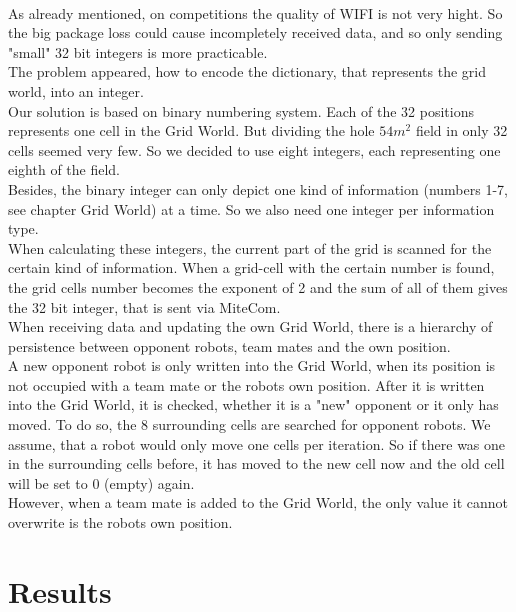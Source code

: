 \documentclass[lnicst,a4paper]{svmultln}
\begin{document}
\\
As already mentioned, on competitions the quality of WIFI is not very hight. So the big package loss could cause incompletely received data, and so only sending "small" 32 bit integers is more practicable. 
\\
The problem appeared, how to encode the dictionary, that represents the grid world, into an integer.
\\
Our solution is based on binary numbering system. Each of the 32 positions represents one cell in the Grid World. But dividing the hole $54m^2$ field in only 32 cells seemed very few. So we decided to use eight integers, each representing one eighth of the field.
\\
Besides, the binary integer can only depict one kind of information (numbers 1-7, see chapter Grid World) at a time. So we also need one integer per information type.
\\
When calculating these integers, the current part of the grid is scanned for the certain kind of information. When a grid-cell with the certain number is found, the grid cells number becomes the exponent of 2 and the sum of all of them gives the 32 bit integer, that is sent via MiteCom.
\\
When receiving data and updating the own Grid World, there is a hierarchy of persistence between opponent robots, team mates and the own position. 
\\
A new opponent robot is only written into the Grid World, when its position is not occupied with a team mate or the robots own position. After it is written into the Grid World, it is checked, whether it is a "new" opponent or it only has moved. To do so, the 8 surrounding cells are searched for opponent robots. We assume, that a robot would only move one cells per iteration. So if there was one in the surrounding cells before, it has moved to the new cell now and the old cell will be set to 0 (empty) again.
\\
However, when a team mate is added to the Grid World, the only value it cannot overwrite is the robots own position.


\section{Results}
\end{document}

